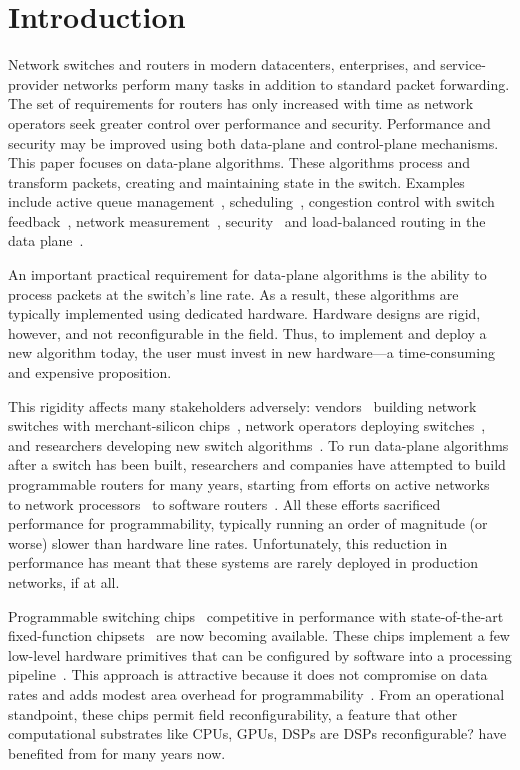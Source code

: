 \section{Introduction}
\label{s:intro}

Network switches and routers in modern datacenters, enterprises, and
service-provider networks perform many tasks in addition to standard packet
forwarding. The set of requirements for routers has only increased with time as
network operators seek greater control over performance and security.
Performance and security may be improved using both data-plane and
control-plane mechanisms. This paper focuses on data-plane algorithms. These
algorithms process and transform packets, creating and maintaining state in the
switch. Examples include active queue management~\cite{red,blue,avq,codel,pie},
scheduling~\cite{pifo_hotnets}, congestion control with switch
feedback~\cite{xcp, rcp, pdq, dctcp}, network measurement~\cite{opensketch,
bitmap_george, elephant_george}, security~\cite{dns_change} and load-balanced
routing in the data plane~\cite{conga}.

An important practical requirement for data-plane algorithms is the
ability to process packets at the switch's line rate.  As a result,
these algorithms are typically implemented using dedicated
hardware. Hardware designs are rigid, however, and not reconfigurable
in the field. Thus, to implement and deploy a new algorithm today, the
user must invest in new hardware---a time-consuming and expensive
proposition.

This rigidity affects many stakeholders adversely:
vendors~\cite{cisco_nexus, dell_force10, arista_7050} building network
switches with merchant-silicon chips~\cite{trident, tomahawk,
  mellanox}, network operators deploying
switches~\cite{google,facebook,vl2}, and researchers developing new
switch algorithms~\cite{xcp, codel, d3, detail, pdq}.  To run
data-plane algorithms after a switch has been built, researchers and
companies have attempted to build programmable routers for many years,
starting from efforts on active networks~\cite{active-nets} to network
processors~\cite{npu_survey} to software
routers~\cite{click, dpdk, routebricks}. All these efforts sacrificed
performance for programmability, typically running an order of
magnitude (or worse) slower than hardware line rates. Unfortunately,
this reduction in performance has meant that these systems are rarely
deployed in production networks, if at all.

Programmable switching chips~\cite{flexpipe, xpliant, rmt, corsa,
  uadp, algo_logic} competitive in performance with state-of-the-art
fixed-function chipsets~\cite{trident, tomahawk, mellanox} are now
becoming available. These chips implement a few low-level hardware
primitives that can be configured by software into a processing
pipeline~\cite{xpliant_sdk,xpliant_sdk2,intel_sdk}.  This approach is
attractive because it does not compromise on data rates and adds
modest area overhead for programmability~\cite{rmt}. From an
operational standpoint, these chips permit field reconfigurability, a
feature that other computational substrates like CPUs, GPUs,
DSPs \ac{are DSPs reconfigurable?} have benefited from for many years now.

